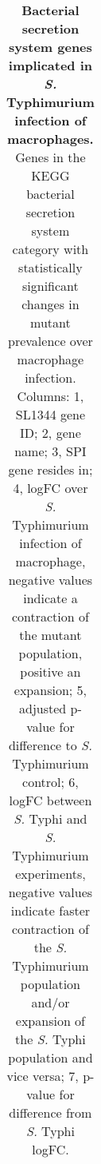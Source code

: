 %
\begin{table}
   \centering
   \noindent
    \caption[Bacterial secretion system genes implicated in \textit{S.} Typhimurium infection of macrophages]{\textbf{Bacterial secretion system genes implicated in \textit{S.} Typhimurium infection of macrophages.} Genes in the KEGG bacterial secretion system category with statistically significant changes in mutant prevalence over macrophage infection. Columns: 1, SL1344 gene ID; 2, gene name; 3, SPI gene resides in; 4, logFC over {\it S.} Typhimurium infection of macrophage, negative values indicate a contraction of the mutant population, positive an expansion; 5, adjusted p-value for difference to {\it S.} Typhimurium control; 6, logFC between {\it S.} Typhi and {\it S.} Typhimurium experiments, negative values indicate faster contraction of the {\it S.} Typhimurium population and/or expansion of the {\it S.} Typhi population and vice versa; 7, p-value for difference from {\it S.} Typhi logFC. }
    \begin{tabular}{ l
    				l
				l
    				r
				c
				r
				c
				}
   

\end{tabular}
\end{table}
